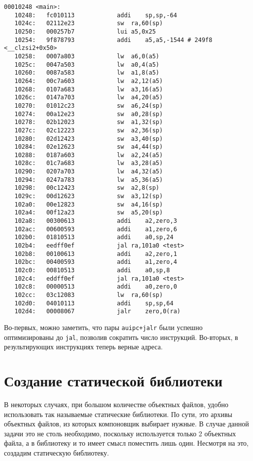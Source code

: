 \begin{Verbatim}[breaklines=true]
00010248 <main>:
   10248:	fc010113          	addi	sp,sp,-64
   1024c:	02112e23          	sw	ra,60(sp)
   10250:	000257b7          	lui	a5,0x25
   10254:	9f878793          	addi	a5,a5,-1544 # 249f8 <__clzsi2+0x50>
   10258:	0007a803          	lw	a6,0(a5)
   1025c:	0047a503          	lw	a0,4(a5)
   10260:	0087a583          	lw	a1,8(a5)
   10264:	00c7a603          	lw	a2,12(a5)
   10268:	0107a683          	lw	a3,16(a5)
   1026c:	0147a703          	lw	a4,20(a5)
   10270:	01012c23          	sw	a6,24(sp)
   10274:	00a12e23          	sw	a0,28(sp)
   10278:	02b12023          	sw	a1,32(sp)
   1027c:	02c12223          	sw	a2,36(sp)
   10280:	02d12423          	sw	a3,40(sp)
   10284:	02e12623          	sw	a4,44(sp)
   10288:	0187a603          	lw	a2,24(a5)
   1028c:	01c7a683          	lw	a3,28(a5)
   10290:	0207a703          	lw	a4,32(a5)
   10294:	0247a783          	lw	a5,36(a5)
   10298:	00c12423          	sw	a2,8(sp)
   1029c:	00d12623          	sw	a3,12(sp)
   102a0:	00e12823          	sw	a4,16(sp)
   102a4:	00f12a23          	sw	a5,20(sp)
   102a8:	00300613          	addi	a2,zero,3
   102ac:	00600593          	addi	a1,zero,6
   102b0:	01810513          	addi	a0,sp,24
   102b4:	eedff0ef          	jal	ra,101a0 <test>
   102b8:	00100613          	addi	a2,zero,1
   102bc:	00400593          	addi	a1,zero,4
   102c0:	00810513          	addi	a0,sp,8
   102c4:	eddff0ef          	jal	ra,101a0 <test>
   102c8:	00000513          	addi	a0,zero,0
   102cc:	03c12083          	lw	ra,60(sp)
   102d0:	04010113          	addi	sp,sp,64
   102d4:	00008067          	jalr	zero,0(ra)
    \end{Verbatim}
    \vspace{2cm}
    Во-первых, можно заметить, что пары \verb|auipc+jalr| были успешно оптимизированы до \verb|jal|, позволив сократить число инструкций. Во-вторых, в результирующих инструкциях теперь верные адреса.

    \section{Создание статической библиотеки}\label{sec:lib}
    В некоторых случаях, при большом количестве объектных файлов, удобно использовать так называемые статические библиотеки. По сути, это архивы объектных файлов, из которых компоновщик выбирает нужные.
    В случае данной задачи это не столь необходимо, поскольку используется только 2 объектных файла, а в библиотеку и то имеет смысл поместить лишь один.
    Несмотря на это, создадим статическую библиотеку.

